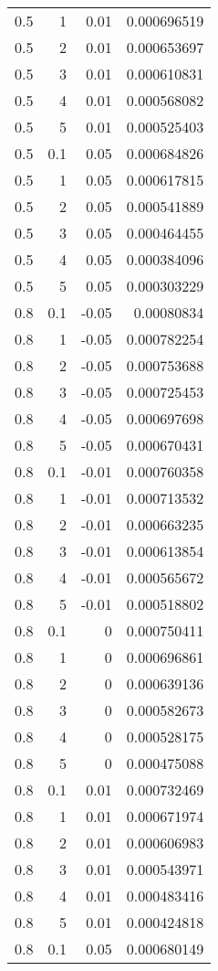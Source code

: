 \documentclass{amsart}
\theoremstyle{plain}
\numberwithin{equation}{section}
\begin{document}
\begin{longtable}{r | r | r | r}
0.5 & 1 & 0.01 & 0.000696519 \\ 
0.5 & 2 & 0.01 & 0.000653697 \\ 
0.5 & 3 & 0.01 & 0.000610831 \\ 
0.5 & 4 & 0.01 & 0.000568082 \\ 
0.5 & 5 & 0.01 & 0.000525403 \\ \hline
0.5 & 0.1 & 0.05 & 0.000684826 \\ 
0.5 & 1 & 0.05 & 0.000617815 \\ 
0.5 & 2 & 0.05 & 0.000541889 \\ 
0.5 & 3 & 0.05 & 0.000464455 \\ 
0.5 & 4 & 0.05 & 0.000384096 \\ 
0.5 & 5 & 0.05 & 0.000303229 \\ \hline
0.8 & 0.1 & -0.05 & 0.00080834 \\ 
0.8 & 1 & -0.05 & 0.000782254 \\ 
0.8 & 2 & -0.05 & 0.000753688 \\ 
0.8 & 3 & -0.05 & 0.000725453 \\ 
0.8 & 4 & -0.05 & 0.000697698 \\ 
0.8 & 5 & -0.05 & 0.000670431 \\ \hline
0.8 & 0.1 & -0.01 & 0.000760358 \\ 
0.8 & 1 & -0.01 & 0.000713532 \\ 
0.8 & 2 & -0.01 & 0.000663235 \\ 
0.8 & 3 & -0.01 & 0.000613854 \\ 
0.8 & 4 & -0.01 & 0.000565672 \\ 
0.8 & 5 & -0.01 & 0.000518802 \\ \hline
0.8 & 0.1 & 0 & 0.000750411 \\ 
0.8 & 1 & 0 & 0.000696861 \\ 
0.8 & 2 & 0 & 0.000639136 \\ 
0.8 & 3 & 0 & 0.000582673 \\ 
0.8 & 4 & 0 & 0.000528175 \\ 
0.8 & 5 & 0 & 0.000475088 \\ \hline
0.8 & 0.1 & 0.01 & 0.000732469 \\ 
0.8 & 1 & 0.01 & 0.000671974 \\ 
0.8 & 2 & 0.01 & 0.000606983 \\ 
0.8 & 3 & 0.01 & 0.000543971 \\ 
0.8 & 4 & 0.01 & 0.000483416 \\ 
0.8 & 5 & 0.01 & 0.000424818 \\ \hline
0.8 & 0.1 & 0.05 & 0.000680149 \\ 

\end{longtable}
\end{document}
